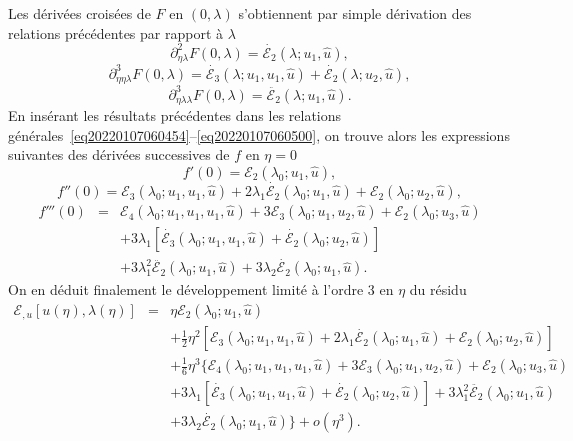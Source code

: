 \documentclass{article}
\begin{document}
Les dérivées croisées de $F$ en $(0, λ)$ s'obtiennent par
simple dérivation des relations précédentes par rapport à
$λ$
\begin{equation}
  \partial_{\eta  λ}^2 F (0, λ) = \dot{ℰ_2}
  (λ ; u_1, \hat{u}),
\end{equation}
\begin{equation}
  \partial_{\eta  \eta  λ}^3 F (0, λ) =
  \dot{ℰ_3} (λ ; u_1, u_1, \hat{u}) + \dot{ℰ_2}
  (λ ; u_2, \hat{u}),
\end{equation}
\begin{equation}
  \partial_{\eta  λ  λ}^3 F (0, λ) =
  \ddot{ℰ_2} (λ ; u_1, \hat{u}) .
\end{equation}
En insérant les résultats précédentes dans les relations
générales~\eqref{eq20220107060454}--\eqref{eq20220107060500}, on
trouve alors les expressions suivantes des dérivées successives de $f$
en $\eta = 0$
\begin{equation}
  f' (0) =ℰ_2 (λ_0 ; u_1, \hat{u}),
\end{equation}
\begin{equation}
  f'' (0) =ℰ_3 (λ_0 ; u_1, u_1, \hat{u}) + 2 λ_1
  \dot{ℰ_2} (λ_0 ; u_1, \hat{u}) +ℰ_2 (λ_0 ;
  u_2, \hat{u}),
\end{equation}
\begin{eqnarray}
  f''' (0) & = & ℰ_4 (λ_0 ; u_1, u_1, u_1, \hat{u}) +
  3ℰ_3 (λ_0 ; u_1, u_2, \hat{u}) +ℰ_2 (λ_0 ;
  u_3, \hat{u}) \nonumber\\
  &  &  + 3 λ_1  [\dot{ℰ_3} (λ_0 ; u_1, u_1,
  \hat{u}) + \dot{ℰ_2} (λ_0 ; u_2, \hat{u})] \nonumber\\
  &  &  + 3 λ_1^2  \ddot{ℰ_2} (λ_0 ; u_1,
  \hat{u}) + 3 λ_2  \dot{ℰ_2} (λ_0 ; u_1, \hat{u}) .
\end{eqnarray}
On en déduit finalement le développement limité à l'ordre 3 en
$\eta$ du résidu
\begin{eqnarray}
  ℰ_{, u} [u (\eta), λ (\eta)] & = & \eta ℰ_2
  (λ_0 ; u_1, \hat{u}) \nonumber\\
  &  &  + \tfrac{1}{2} \eta^2  [ℰ_3 (λ_0 ; u_1, u_1,
  \hat{u}) + 2 λ_1  \dot{ℰ_2} (λ_0 ; u_1, \hat{u})
  +ℰ_2 (λ_0 ; u_2, \hat{u})] \nonumber\\
  &  &  + \tfrac{1}{6} \eta^3  \{ ℰ_4 (λ_0 ; u_1,
  u_1, u_1, \hat{u}) + 3ℰ_3 (λ_0 ; u_1, u_2, \hat{u})
   +ℰ_2 (λ_0 ; u_3, \hat{u}) \nonumber\\
  &  &  + 3 λ_1  [\dot{ℰ_3} (λ_0 ; u_1, u_1,
  \hat{u}) + \dot{ℰ_2} (λ_0 ; u_2, \hat{u})] + 3 λ_1^2
  \ddot{ℰ_2} (λ_0 ; u_1, \hat{u}) \nonumber\\
  &  &   + 3 λ_2  \dot{ℰ_2} (λ_0 ;
  u_1, \hat{u}) \} + o (\eta^3) .  \label{eq20220107080901}
\end{eqnarray}
\end{document}

